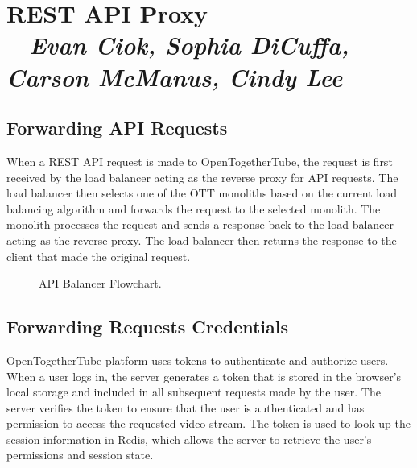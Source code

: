 \chapter{REST API Proxy \\
  \small{\textit{-- Evan Ciok, Sophia DiCuffa, Carson McManus, Cindy Lee}}
  \label{Chapter::RestApiProxy}}

\section{Forwarding API Requests}
When a REST API request is made to OpenTogetherTube, the request is first received by the load balancer
acting as the reverse proxy for API requests. The load balancer then selects one of the OTT monoliths based
on the current load balancing algorithm and forwards the request to the selected monolith. The monolith processes
the request and sends a response back to the load balancer acting as the reverse proxy. The load balancer then returns
the response to the client that made the original request.

\begin{figure}[!htb]
  \centering
  \caption{\label{Figure::api-balancer} API Balancer Flowchart.}
\end{figure}

\section{Forwarding Requests Credentials}

OpenTogetherTube platform uses tokens to authenticate and authorize users. When a user logs in, the
server generates a token that is stored in the browser's local storage and included in all subsequent requests made
by the user. The server verifies the token to ensure that the user is authenticated and has permission to access the
requested video stream. The token is used to look up the session information in Redis, which allows the server to
retrieve the user's permissions and session state.


